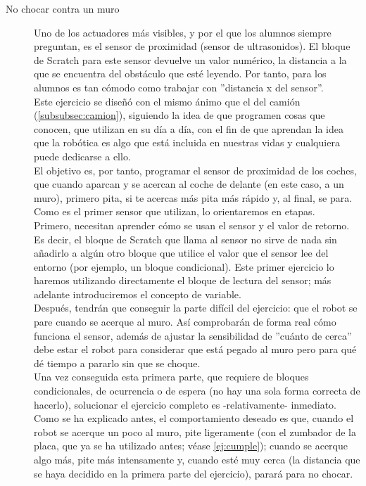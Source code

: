 \begin{description}
	


\item [No chocar contra un muro]\label{ej:muro}
Uno de los actuadores más visibles, y por el que los alumnos siempre preguntan, es el sensor de proximidad (sensor de ultrasonidos). El bloque de Scratch para este sensor devuelve un valor numérico, la distancia a la que se encuentra del obstáculo que esté leyendo. Por tanto, para los alumnos es tan cómodo como trabajar con ''distancia x del sensor''. \\
Este ejercicio se diseñó con el mismo ánimo que el del camión (\ref{subsubsec:camion}), siguiendo la idea de que programen cosas que conocen, que utilizan en su día a día, con el fin de que aprendan la idea que la robótica es algo que está incluida en nuestras vidas y cualquiera puede dedicarse a ello.\\
El objetivo es, por tanto, programar el sensor de proximidad de los coches, que cuando aparcan y se acercan al coche de delante (en este caso, a un muro), primero pita, si te acercas más pita más rápido y, al final, se para. \\
Como es el primer sensor que utilizan, lo orientaremos en etapas. \\
Primero, necesitan aprender cómo se usan el sensor y el valor de retorno. Es decir, el bloque de Scratch que llama al sensor no sirve de nada sin añadirlo a algún otro bloque que utilice el valor que el sensor lee del entorno (por ejemplo, un bloque condicional). Este primer ejercicio lo haremos utilizando directamente el bloque de lectura del sensor; más adelante introduciremos el concepto de variable.\\
Después, tendrán que conseguir la parte difícil del ejercicio: que el robot se pare cuando se acerque al muro. Así comprobarán de forma real cómo funciona el sensor, además de ajustar la sensibilidad de ''cuánto de cerca'' debe estar el robot para considerar que está pegado al muro pero para qué dé tiempo a pararlo sin que se choque.\\
Una vez conseguida esta primera parte, que requiere de bloques condicionales, de ocurrencia o de espera (no hay una sola forma correcta de hacerlo), solucionar el ejercicio completo es -relativamente- inmediato. Como se ha explicado antes, el comportamiento deseado es que, cuando el robot se acerque un poco al muro, pite ligeramente (con el zumbador de la placa, que ya se ha utilizado antes; véase \ref{ej:cumple}); cuando se acerque algo más, pite más intensamente y, cuando esté muy cerca (la distancia que se haya decidido en la primera parte del ejercicio), parará para no chocar.

\end{description}
